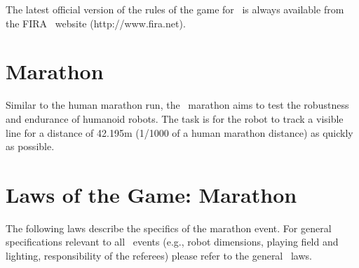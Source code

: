 \documentclass[12pt]{hurocup}
\begin{document}
The latest official version of the rules of the game for \HuroCup\ is
always available from the FIRA \HuroCup\ website (http://www.fira.net).

\newpage

\section{Marathon}
\label{sec:marathon} 

Similar to the human marathon run, the \HuroCup\ marathon aims to test
the robustness and endurance of humanoid robots. The task is for the
robot to track a visible line for a distance of 42.195m (1/1000 of a
human marathon distance) as quickly as possible. 

\section{Laws of the Game: Marathon}
\label{sec:marathon-laws}

The following laws describe the specifics of the marathon
event. For general specifications relevant to all \HuroCup\ events
(e.g., robot dimensions, playing field and lighting, responsibility of
the referees) please refer to the general \HuroCup\ laws.

\label{mr-field}
\end{document}
